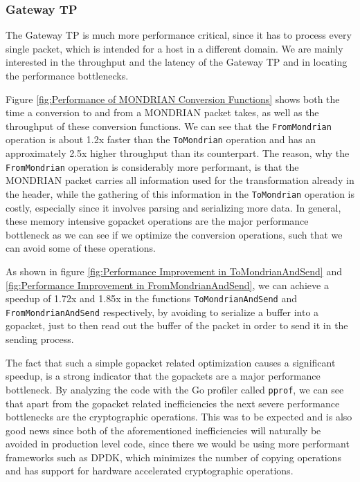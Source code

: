 \FloatBarrier
\subsubsection{Gateway TP}
The Gateway \acs{TP} is much more performance critical, since it has to process every single packet, which is intended for a host in a different domain. We are mainly interested in the throughput and the latency of the Gateway \acs{TP} and in locating the performance bottlenecks.

Figure \ref{fig:Performance of MONDRIAN Conversion Functions} shows both the time a conversion to and from a MONDRIAN packet takes, as well as the throughput of these conversion functions. We can see that the \texttt{FromMondrian} operation is about 1.2x faster than the \texttt{ToMondrian} operation and has an approximately 2.5x higher throughput than its counterpart. The reason, why the \texttt{FromMondrian} operation is considerably more performant, is that the MONDRIAN packet carries all information used for the transformation already in the header, while the gathering of this information in the \texttt{ToMondrian} operation is costly, especially since it involves parsing and serializing more data. In general, these memory intensive gopacket operations are the major performance bottleneck as we can see if we optimize the conversion operations, such that we can avoid some of these operations.

As shown in figure \ref{fig:Performance Improvement in ToMondrianAndSend} and \ref{fig:Performance Improvement in FromMondrianAndSend}, we can achieve a speedup of 1.72x and 1.85x in the functions \texttt{ToMondrianAndSend} and \texttt{FromMondrianAndSend} respectively, by avoiding to serialize a buffer into a gopacket, just to then read out the buffer of the packet in order to send it in the sending process.

The fact that such a simple gopacket related optimization causes a significant speedup, is a strong indicator that the gopackets are a major performance bottleneck. By analyzing the code with the Go profiler called \texttt{pprof}, we can see that apart from the gopacket related inefficiencies the next severe performance bottlenecks are the cryptographic operations. This was to be expected and is also good news since both of the aforementioned inefficiencies will naturally be avoided in production level code, since there we would be using more performant frameworks such as \acs{DPDK}, which minimizes the number of copying operations and has support for hardware accelerated cryptographic operations.


